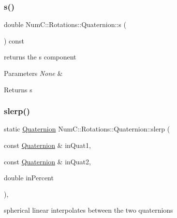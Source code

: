 \subsubsection{\texorpdfstring{s()}{s()}}
{\footnotesize\ttfamily double Num\+C\+::\+Rotations\+::\+Quaternion\+::s (\begin{DoxyParamCaption}{ }\end{DoxyParamCaption}) const\hspace{0.3cm}{\ttfamily [inline]}}

returns the s component


\begin{DoxyParams}{Parameters}
{\em None} & \\
\hline
\end{DoxyParams}
\begin{DoxyReturn}{Returns}
s 
\end{DoxyReturn}
\mbox{\label{class_num_c_1_1_rotations_1_1_quaternion_a70f6f155f1be9ca15b4b1d36ba416c9b}} 
\subsubsection{\texorpdfstring{slerp()}{slerp()}\hspace{0.1cm}{\footnotesize\ttfamily [1/2]}}
{\footnotesize\ttfamily static \mbox{\hyperlink{class_num_c_1_1_rotations_1_1_quaternion}{Quaternion}} Num\+C\+::\+Rotations\+::\+Quaternion\+::slerp (\begin{DoxyParamCaption}\item[{const \mbox{\hyperlink{class_num_c_1_1_rotations_1_1_quaternion}{Quaternion}} \&}]{in\+Quat1,  }\item[{const \mbox{\hyperlink{class_num_c_1_1_rotations_1_1_quaternion}{Quaternion}} \&}]{in\+Quat2,  }\item[{double}]{in\+Percent }\end{DoxyParamCaption})\hspace{0.3cm}{\ttfamily [inline]}, {\ttfamily [static]}}

spherical linear interpolates between the two quaternions


